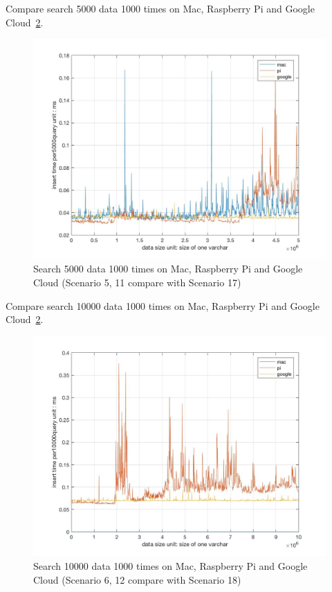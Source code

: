 Compare search 5000 data 1000 times on Mac, Raspberry Pi and Google 
Cloud~\ref{f:fly}.

\begin{figure}[!ht]
  \centering\includegraphics[width=\columnwidth]
  {images/search_comp_5000_three.jpg}
  \caption{Search 5000 data 1000 times on  Mac, Raspberry Pi and Google Cloud
  (Scenario 5, 11 compare with Scenario 17)}\label{f:fly}
\end{figure}


Compare search 10000 data 1000 times on Mac, Raspberry Pi and Google 
Cloud~\ref{f:fly}.

\begin{figure}[!ht]
  \centering\includegraphics[width=\columnwidth]
  {images/search_comp_10000_three.jpg}
  \caption{Search 10000 data 1000 times on  Mac, Raspberry Pi and Google
   Cloud
  (Scenario 6, 12 compare with Scenario 18)}\label{f:fly}
\end{figure}


